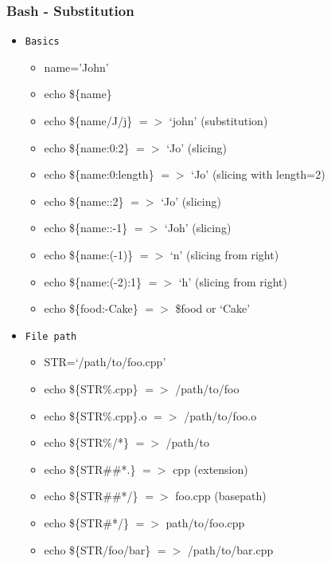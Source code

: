 \subsubsection{Bash - Substitution}
\begin{frame}[fragile]{\subsubsecname}
  \begin{itemize}
    \item \texttt{Basics}
    \begin{itemize}
      \item name='John'
      \item echo \$\{name\}
      \item echo \$\{name/J/j\} $=>$ `john' (substitution)
      \item echo \$\{name:0:2\} $=>$ `Jo' (slicing)
      \item echo \$\{name:0:length\} $=>$ `Jo' (slicing with length=2)
      \item echo \$\{name::2\} $=>$ `Jo' (slicing)
      \item echo \$\{name::-1\} $=>$ `Joh' (slicing)
      \item echo \$\{name:(-1)\} $=>$ `n' (slicing from right)
      \item echo \$\{name:(-2):1\} $=>$ `h' (slicing from right)
      \item echo \$\{food:-Cake\} $=>$ \$food or `Cake'
    \end{itemize}
    \item \texttt{File path}
    \begin{itemize}
      \item STR=`/path/to/foo.cpp'
      \item echo \$\{STR\%.cpp\} $=>$ /path/to/foo
      \item echo \$\{STR\%.cpp\}.o $=>$ /path/to/foo.o
      \item echo \$\{STR\%/*\} $=>$ /path/to
      \item echo \$\{STR\#\#*.\} $=>$ cpp (extension)
      \item echo \$\{STR\#\#*/\} $=>$ foo.cpp (basepath)
      \item echo \$\{STR\#*/\} $=>$ path/to/foo.cpp
      \item echo \$\{STR/foo/bar\} $=>$ /path/to/bar.cpp
    \end{itemize}
  \end{itemize}
\end{frame}

